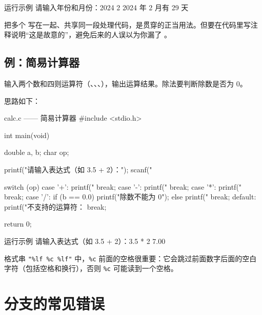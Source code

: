 \begin{outbox}{运行示例}
请输入年份和月份：2024 2
2024 年 2 月有 29 天
\end{outbox}

把多个  写在一起、共享同一段处理代码，是贯穿的正当用法。但要在代码里写注释说明“这是故意的”，避免后来的人误以为你漏了 。

\subsection{例：简易计算器}

\begin{example}
输入两个数和四则运算符（\code{+}、\code{-}、\code{*}、\code{/}），输出运算结果。除法要判断除数是否为 0。
\end{example}
\begin{solution}
思路如下：

\begin{codebox}{calc.c —— 简易计算器}
#include <stdio.h>

int main(void)
{
    double a, b;
    char op;

    printf("请输入表达式（如 3.5 + 2）：");
    scanf("%

    switch (op) {
    case '+':
        printf("%
        break;
    case '-':
        printf("%
        break;
    case '*':
        printf("%
        break;
    case '/':
        if (b == 0.0) {
            printf("除数不能为 0\n");
        } else {
            printf("%
        }
        break;
    default:
        printf("不支持的运算符：%
        break;
    }

    return 0;
}
\end{codebox}

\begin{outbox}{运行示例}
请输入表达式（如 3.5 + 2）：3.5 * 2
7.00
\end{outbox}

格式串 \texttt{"\%lf \%c \%lf"} 中，\texttt{\%c} 前面的空格很重要：它会跳过前面数字后面的空白字符（包括空格和换行），否则 \texttt{\%c} 可能读到一个空格。
\end{solution}

\section{分支的常见错误}

